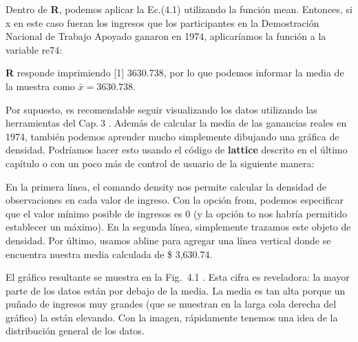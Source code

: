 \documentclass[
]{book}
\newenvironment{Shaded}{\begin{snugshade}}{\end{snugshade}}
\newcommand{\AttributeTok}[1]{\textcolor[rgb]{0.77,0.63,0.00}{#1}}
\newcommand{\DecValTok}[1]{\textcolor[rgb]{0.00,0.00,0.81}{#1}}
\newcommand{\FloatTok}[1]{\textcolor[rgb]{0.00,0.00,0.81}{#1}}
\newcommand{\FunctionTok}[1]{\textcolor[rgb]{0.00,0.00,0.00}{#1}}
\newcommand{\NormalTok}[1]{#1}
\newcommand{\OtherTok}[1]{\textcolor[rgb]{0.56,0.35,0.01}{#1}}
\newcommand{\SpecialCharTok}[1]{\textcolor[rgb]{0.00,0.00,0.00}{#1}}
\newcommand{\StringTok}[1]{\textcolor[rgb]{0.31,0.60,0.02}{#1}}
\begin{document}
Dentro de \textbf{R}, podemos aplicar la Ec.(4.1) utilizando la función mean. Entonces, si x en este caso fueran los ingresos que los participantes en la Demostración Nacional de Trabajo Apoyado ganaron en 1974, aplicaríamos la función a la variable re74:

\begin{Shaded}
\end{Shaded}

\textbf{R} responde imprimiendo {[}1{]} 3630.738, por lo que podemos informar la media de la muestra como \(\bar{x}=3630.738\).

Por supuesto, es recomendable seguir visualizando los datos utilizando las herramientas del Cap. 3 . Además de calcular la media de las ganancias reales en 1974, también podemos aprender mucho simplemente dibujando una gráfica de densidad. Podríamos hacer esto usando el código de \textbf{lattice} descrito en el último capítulo o con un poco más de control de usuario de la siguiente manera:

\begin{Shaded}
\end{Shaded}

En la primera línea, el comando density nos permite calcular la densidad de observaciones en cada valor de ingreso. Con la opción from, podemos especificar que el valor mínimo posible de ingresos es 0 (y la opción to nos habría permitido establecer un máximo). En la segunda línea, simplemente trazamos este objeto de densidad. Por último, usamos abline para agregar una línea vertical donde se encuentra nuestra media calculada de \$ 3,630.74.

El gráfico resultante se muestra en la Fig.  4.1 . Esta cifra es reveladora: la mayor parte de los datos están por debajo de la media. La media es tan alta porque un puñado de ingresos muy grandes (que se muestran en la larga cola derecha del gráfico) la están elevando. Con la imagen, rápidamente tenemos una idea de la distribución general de los datos.
\end{document}
